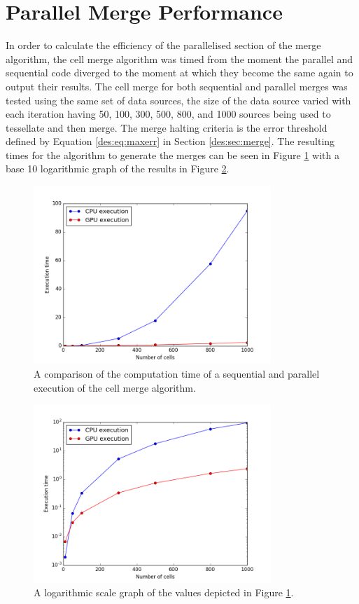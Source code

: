 \section{Parallel Merge Performance}
In order to calculate the efficiency of the parallelised section of the merge algorithm, the cell merge algorithm was timed from the moment the parallel and sequential code diverged to the moment at which they become the same again to output their results. The cell merge for both sequential and parallel merges was tested using the same set of data sources, the size of the data source varied with each iteration having 50, 100, 300, 500, 800, and 1000 sources being used to tessellate and then merge. The merge halting criteria is the error threshold defined by Equation \ref{des:eq:maxerr} in Section \ref{des:sec:merge}. The resulting times for the algorithm to generate the merges can be seen in Figure \ref{res:fig:cvg} with a base 10 logarithmic graph of the results in Figure \ref{res:fig:cvg_1og}.
\begin{figure}[H]
\centering
\includegraphics[width=0.8\textwidth]{Images/result_cvg.png}
\caption{A comparison of the computation time of a sequential and parallel execution of the cell merge algorithm.}
\label{res:fig:cvg}
\end{figure}
\begin{figure}[H]
\centering
\includegraphics[width=0.8\textwidth]{Images/result_cvg_log.png}
\caption{A logarithmic scale graph of the values depicted in Figure \ref{res:fig:cvg}.}
\label{res:fig:cvg_1og}
\end{figure}
